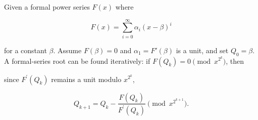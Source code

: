 Given a formal power series $F(x)$ where

$$ F(x) = \sum_{i=0}^{\infty}{\alpha_i(x - \beta)^i} $$

for a constant $\beta$. Assume $F(\beta)=0$ and $\alpha_1=F'(\beta)$ is a unit, and set $Q_0=\beta$. A formal-series root can be found iteratively: if $F(Q_k)=0\pmod{x^{2^k}}$, then

since $F^\prime(Q_k)$ remains a unit modulo $x^{2^k}$,

$$ Q_{k+1} = Q_k - \frac{F(Q_k)}{F^\prime(Q_k)} \pmod {x^{2^{k+1}}}. $$
